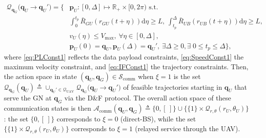 \documentclass[12pt, draftcls, onecolumn]{IEEEtran}
\theoremstyle{plain}
\theoremstyle{definition}
\theoremstyle{remark}
\begin{document}
\begin{align}
	\mathcal{Q}_{\mathbf q_G} \big({\mathbf q}_U\rightarrow{\mathbf q}_U'\big) = \Big\{ &\mathbf{p}_{U} : 
	[0,\Delta] \mapsto \mathbb{R}_{+} \times[0,2\pi)\text{ s.t.}\\
	&\int_{0}^{t_{p}} \bar{R}_{GU}(r_{GU}(t+\eta)) \mathrm d \eta \geq L, \ \int_{t_p}^{\Delta} \bar R_{UB}(r_{UB}(t+\eta)) \mathrm d \eta \geq L, \label{eq:PLConst1}\tag{C.1}\\
	&v_U (\eta) \leq V_{\mathrm{max}},\ \forall\eta\in[0,\Delta],\label{eq:SpeedConst1}\tag{C.2}\\
	&\mathbf{p}_{U}(0) ={\mathbf q}_U, 
	\mathbf{p}_{U}(\Delta) ={\mathbf q}_U',\label{eq:IFConst1}\ \exists \Delta \geq 0, \exists\; 0 \leq t_p \leq \Delta 
	\Big\},
	\tag{C.3}
\end{align}
where \ref{eq:PLConst1} reflects the data payload constraints, \ref{eq:SpeedConst1} the maximum velocity constraint, and \ref{eq:IFConst1} the trajectory constraints. Then, the action space in state $(\mathbf{q}_{U},\mathbf{q}_{G}){\in}\mathcal{S}_{\mathrm{comm}}$ when $\xi{=}1$ is the set $\mathcal{Q}_{\mathbf{q}_{G}}(\mathbf{q}_{U}){\triangleq}\cup_{\mathbf{q}_{U}'{\in}\mathcal{Q}_{\mathrm{UAV}}}\mathcal{Q}_{\mathbf{q}_{G}}\big(\mathbf{q}_{U}{\rightarrow}\mathbf{q}_{U}'\big)$ of feasible trajectories starting in $\mathbf{q}_{U}$ that serve the GN at $\mathbf{q}_{G}$ via the D\&F protocol. The overall action space of these {communication} states is then $\mathcal{A}_{\mathrm{comm}}(\mathbf{q}_{U},\mathbf{q}_{G}){\triangleq}\{0,[\ ]\}{\cup}\{\{1\}{\times}\mathcal{Q}_{r,\theta}(r_{U},\theta_{U})\}$: the set $\{0, [\ ]\}$ corresponds to $\xi{=}0$ (direct-BS), while the set $\{\{1\}{\times}\mathcal{Q}_{r,\theta}(r_{U},\theta_{U})\}$ corresponds to $\xi{=}1$ (relayed service through the UAV).
\end{document}
